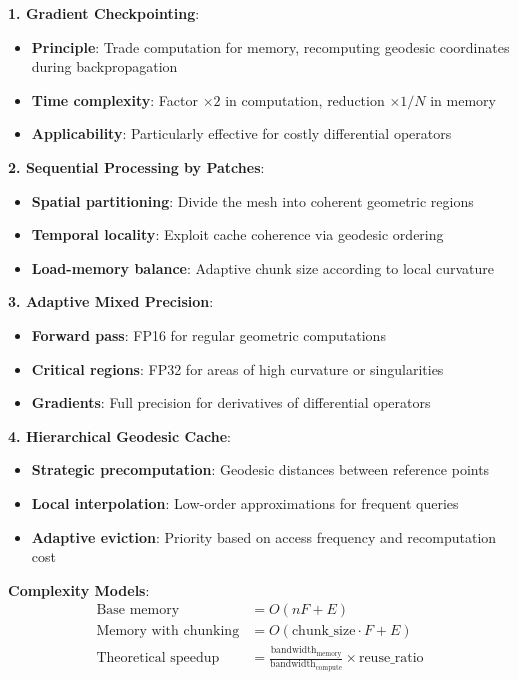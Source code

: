 \textbf{1. Gradient Checkpointing}:
\begin{itemize}
    \item \textbf{Principle}: Trade computation for memory, recomputing geodesic coordinates during backpropagation
    \item \textbf{Time complexity}: Factor $\times 2$ in computation, reduction $\times 1/N$ in memory
    \item \textbf{Applicability}: Particularly effective for costly differential operators
\end{itemize}

\textbf{2. Sequential Processing by Patches}:
\begin{itemize}
    \item \textbf{Spatial partitioning}: Divide the mesh into coherent geometric regions
    \item \textbf{Temporal locality}: Exploit cache coherence via geodesic ordering
    \item \textbf{Load-memory balance}: Adaptive chunk size according to local curvature
\end{itemize}

\textbf{3. Adaptive Mixed Precision}:
\begin{itemize}
    \item \textbf{Forward pass}: FP16 for regular geometric computations
    \item \textbf{Critical regions}: FP32 for areas of high curvature or singularities
    \item \textbf{Gradients}: Full precision for derivatives of differential operators
\end{itemize}

\textbf{4. Hierarchical Geodesic Cache}:
\begin{itemize}
    \item \textbf{Strategic precomputation}: Geodesic distances between reference points
    \item \textbf{Local interpolation}: Low-order approximations for frequent queries
    \item \textbf{Adaptive eviction}: Priority based on access frequency and recomputation cost
\end{itemize}

\textbf{Complexity Models}:
\begin{align}
\text{Base memory} &= O(nF + E) \\
\text{Memory with chunking} &= O(\text{chunk\_size} \cdot F + E) \\
\text{Theoretical speedup} &= \frac{\text{bandwidth}_{\text{memory}}}{\text{bandwidth}_{\text{compute}}} \times \text{reuse\_ratio}
\end{align}

